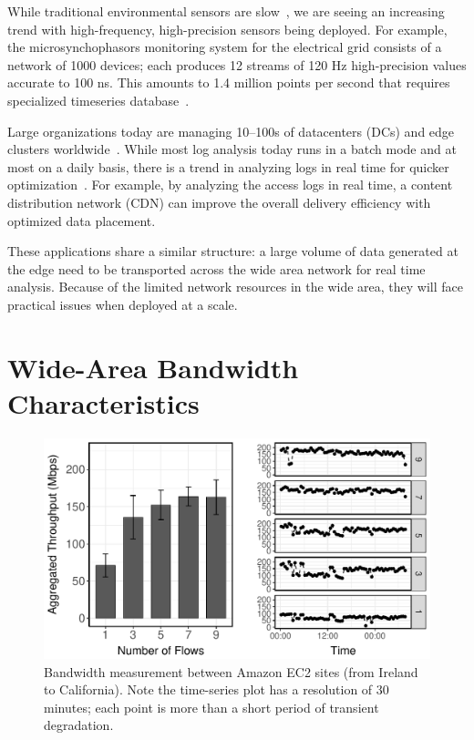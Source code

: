 \documentclass[thesis.tex]{subfiles}
\begin{document}
 While traditional environmental sensors are
slow~\cite{atzori2010internet}, we are seeing an increasing trend with
high-frequency, high-precision sensors being deployed. For example, the
microsynchophasors monitoring system for the electrical grid consists of a
network of 1000 devices; each produces 12 streams of 120 Hz high-precision
values accurate to 100 ns. This amounts to 1.4 million points per second that
requires specialized timeseries database~\cite{andersen2016btrdb}.

 Large organizations today are managing 10--100s of
datacenters (DCs) and edge clusters worldwide~\cite{calder2013mapping}. While
most log analysis today runs in a batch mode and at most on a daily basis, there
is a trend in analyzing logs in real time for quicker
optimization~\cite{alspaugh2014analyzing}. For example, by analyzing the access
logs in real time, a content distribution network (CDN) can improve the overall
delivery efficiency with optimized data placement.

\vspace{0.5em}

These applications share a similar structure: a large volume of data generated
at the edge need to be transported across the wide area network for real time
analysis. Because of the limited network resources in the wide area, they will
face practical issues when deployed at a scale.

\section{Wide-Area Bandwidth Characteristics}
\label{sec:making-case-adapt}

\begin{figure}
  \centering
  \includegraphics[width=.95\linewidth]{figures/europe-to-us-west.pdf}
  \caption{Bandwidth measurement between Amazon EC2 sites (from Ireland to
    California). Note the time-series plot has a resolution of 30 minutes; each
    point is more than a short period of transient degradation.}
  \label{fig:bw}
\end{figure}
\end{document}
